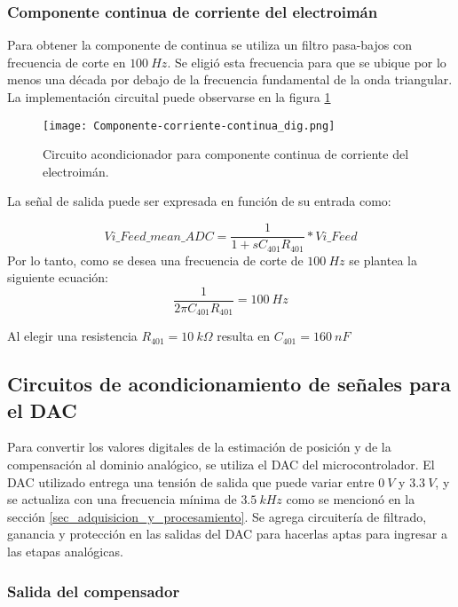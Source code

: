 \subsubsection{Componente continua de corriente del electroimán}

 Para obtener la componente de continua se utiliza un filtro pasa-bajos con frecuencia de corte en $100\:Hz$. Se eligió esta frecuencia para que se ubique por lo menos una década por debajo de la frecuencia fundamental de la onda triangular. La implementación circuital puede observarse en la figura \ref{fig:componente-corriente-continua}


\begin{figure}[H]
	\centering
	\texttt{[image: Componente-corriente-continua\_dig.png]}
	\caption{Circuito acondicionador para componente continua de corriente del electroimán.
	}
	\label{fig:componente-corriente-continua}
\end{figure}

La señal de salida puede ser expresada en función de su entrada como:

\begin{equation*}
	Vi\_Feed\_mean\_ADC=\frac{1}{1+sC_{401}R_{401}}*Vi\_Feed
\end{equation*}
Por lo tanto, como se desea una frecuencia de corte de $100\:Hz$ se plantea la siguiente ecuación:
\begin{equation*} 
	\frac{1}{2\pi C_{401}R_{401}}=100\:Hz
\end{equation*}

Al elegir una resistencia $R_{401}=10\:k\Omega$ resulta en $C_{401}=160\:nF$


\subsection{Circuitos de acondicionamiento de señales para el DAC}

 Para convertir los valores digitales de la estimación de posición y de la compensación al dominio analógico, se utiliza el DAC del microcontrolador. El DAC utilizado entrega una tensión de salida que puede variar entre $0\:V$ y $3.3\:V$, y se actualiza con una frecuencia mínima de $3.5\:kHz$ como se mencionó en la sección \ref{sec_adquisicion_y_procesamiento}. Se agrega circuitería de filtrado, ganancia y protección en las salidas del DAC para hacerlas aptas para ingresar a las etapas analógicas.
 
\subsubsection{Salida del compensador}

